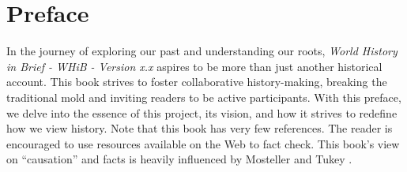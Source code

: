 \documentclass[a4paper,12pt]{book}
\begin{document}
\begin{titlepage}
\end{titlepage}



\tableofcontents
\cleardoublepage

\chapter*{Preface}
In the journey of exploring our past and understanding our roots, \emph{World History in Brief - WHiB - Version x.x} aspires to be more than just another historical account. This book strives to foster collaborative history-making, breaking the traditional mold and inviting readers to be active participants. With this preface, we delve into the essence of this project, its vision, and how it strives to redefine how we view history. Note that this book has very few references. The reader is encouraged to use resources available on the Web to fact check. This book's view on ``causation'' and facts is heavily influenced by Mosteller and Tukey \cite{mosteller1977}.
\end{document}
